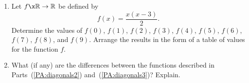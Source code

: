 \begin{previewactivity}
\begin{enumerate}
\item Let  $f\x \mathbb{R} \to \mathbb{R}$  be defined by  
\[
f( x ) = \frac{{x\left( {x - 3} \right)}}{2}.
\]
Determine the values of $f(0)$, $f(1)$, $f(2)$, $f(3)$, $f(4)$, $f(5)$, $f(6)$, $f(7)$, 
$f(8)$, and $f(9)$.  Arrange the results in the form of a table of values for the function $f$\!.
\label{PA:diagonals3}%


\item	What (if any) are the differences between the functions described in Parts~(\ref{PA:diagonals2}) and~(\ref{PA:diagonals3})?  Explain.

\end{enumerate}
\end{previewactivity}
\hbreak


